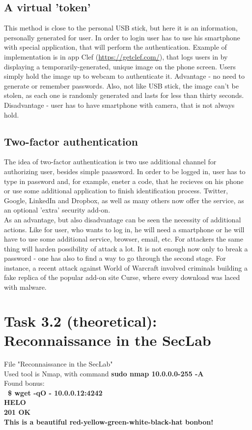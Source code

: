 \documentclass{article}
\begin{document}
\subsection*{ A virtual 'token' }
\cite{altern} This method is close to the personal USB stick, but here it is an information, personally generated for user. In order to login user has to use his smartphone with special application, that will perform the authentication. Example of implementation is in app Clef (\url{https://getclef.com/}), that logs users in by displaying a temporarily-generated, unique image on the phone screen. Users simply hold the image up to webcam to authenticate it. Advantage - no need to generate or remember passwords. Also, not like USB stick, the image can't be stolen, as each one is randomly generated and lasts for less than thirty seconds. Disadvantage - user has to have smartphone with camera, that is not always hold.

\subsection*{ Two-factor authentication }
The idea of two-factor authentication is two use additional channel for authorizing user, besides simple paassword. In order to be logged in, user has to type in password and, for example, eneter a code, that he recieves on his phone or use some additional application to finish identification process. Twitter, Google, LinkedIn and Dropbox, as well as many others now offer the service, as an optional 'extra' security add-on. 
\\
As an advantage, but also disadvantage can be seen the necessity of additional actions. Like for user, who wants to log in, he will need a smartphone or he will have to use some additional service, browser, email, etc. For attackers the same thing will harden possibility of attack a lot. It is not enough now only to break a password - one has also to find a way to go through the second stage. For instance, a recent attack against World of Warcraft involved criminals building a fake replica of the popular add-on site Curse, where every download was laced with malware. \cite{twofact}

\section*{Task 3.2 (theoretical): Reconnaissance in the SecLab}
File "Reconnaissance in the SecLab"
\\
Used tool is Nmap, with command \textbf{sudo nmap 10.0.0.0-255 -A}
\\
Found bonus:
\\
\textbf {
~\$ wget -qO - 10.0.0.12:4242
\\
HELO
\\
201 OK
\\
This is a beautiful red-yellow-green-white-black-hat bonbon!}
\end{document}
